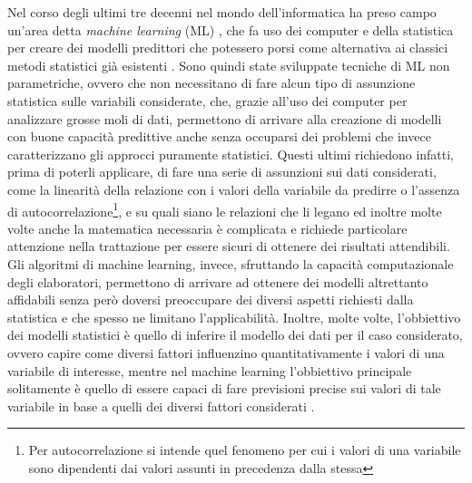 Nel corso degli ultimi tre decenni nel mondo dell'informatica ha preso campo un'area detta \textit{machine learning} (ML)
, che fa uso dei computer e della statistica per creare dei modelli predittori che potessero porsi come alternativa ai classici metodi statistici già esistenti \cite{james2013introduction}. Sono quindi state sviluppate tecniche di ML non parametriche, ovvero che non necessitano di fare alcun tipo di assunzione statistica sulle variabili considerate, che, grazie all'uso dei computer per analizzare grosse moli di dati, permettono di arrivare alla creazione di modelli con buone capacità predittive anche senza occuparsi dei problemi che invece caratterizzano gli approcci puramente statistici. Questi ultimi richiedono infatti, prima di poterli applicare, di fare una serie di assunzioni
sui dati considerati, come la linearità della relazione con i valori della variabile da predirre o l'assenza di autocorrelazione\footnote{Per autocorrelazione si intende quel fenomeno per cui i valori di una variabile sono dipendenti dai valori assunti in precedenza dalla stessa}, e su quali siano le relazioni che li legano ed inoltre molte volte anche la matematica necessaria è complicata e richiede particolare attenzione nella trattazione per essere sicuri di ottenere dei risultati attendibili. Gli algoritmi di machine learning, invece, sfruttando la capacità computazionale degli elaboratori, permettono di arrivare ad ottenere dei modelli altrettanto affidabili senza però doversi preoccupare dei diversi aspetti richiesti dalla statistica e che spesso ne limitano l'applicabilità. Inoltre, molte volte, l'obbiettivo dei modelli statistici è quello di inferire il modello dei dati per il caso considerato, ovvero capire come diversi fattori influenzino quantitativamente i valori di una variabile di interesse, mentre nel machine learning l'obbiettivo principale solitamente è quello di essere capaci di fare previsioni precise sui valori di tale variabile in base a quelli dei diversi fattori considerati \cite{breiman2003statistical}. 

